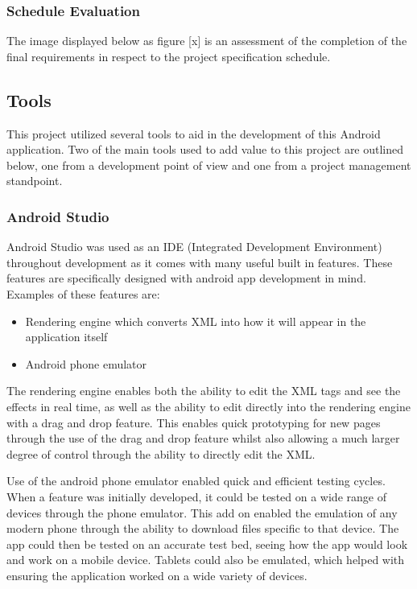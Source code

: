 \documentclass{article}
\begin{document}
%
%
%
%
%

\subsubsection{Schedule Evaluation}

The image displayed below as figure [x] is an assessment of the completion of the final requirements in respect to the project specification schedule. 

%
%
%
%
%

\subsection{Tools}

This project utilized several tools to aid in the development of this Android application. Two of the main tools used to add value to this project are outlined below, one from a development point of view and one from a project management standpoint. 

\subsubsection{Android Studio}

Android Studio was used as an IDE (Integrated Development Environment) throughout development as it comes with many useful built in features. These features are specifically designed with android app development in mind. Examples of these features are: 

\begin{itemize}
	\item Rendering engine which converts XML into how it will appear in the application itself
	\item Android phone emulator
\end{itemize}

The rendering engine enables both the ability to edit the XML tags and see the effects in real time, as well as the ability to edit directly into the rendering engine with a drag and drop feature. This enables quick prototyping for new pages through the use of the drag and drop feature whilst also allowing a much larger degree of control through the ability to directly edit the XML. \par

Use of the android phone emulator enabled quick and efficient testing cycles. When a feature was initially developed, it could be tested on a wide range of devices through the phone emulator. This add on enabled the emulation of any modern phone through the ability to download files specific to that device. The app could then be tested on an accurate test bed, seeing how the app would look and work on a mobile device. Tablets could also be emulated, which helped with ensuring the application worked on a wide variety of devices. \par
\end{document}
